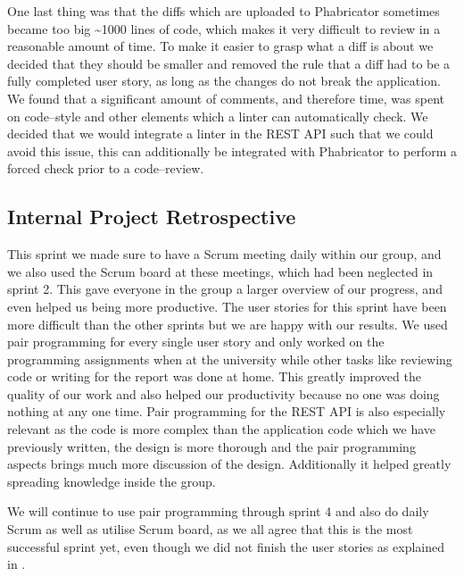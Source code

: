 One last thing was that the diffs which are uploaded to Phabricator sometimes became too big \textasciitilde 1000 lines of code, which makes it very difficult to review in a reasonable amount of time.
To make it easier to grasp what a diff is about we decided that they should be smaller and removed the rule that a diff had to be a fully completed user story, as long as the changes do not break the application.
We found that a significant amount of comments, and therefore time, was spent on code--style and other elements which a linter can automatically check.
We decided that we would integrate a linter in the REST API such that we could avoid this issue, this can additionally be integrated with Phabricator to perform a forced check prior to a code--review.

\subsection*{Internal Project Retrospective}
This sprint we made sure to have a Scrum meeting daily within our group, and we also used the Scrum board at these meetings, which had been neglected in sprint 2. 
This gave everyone in the group a larger overview of our progress, and even helped us being more productive.
The user stories for this sprint have been more difficult than the other sprints but we are happy with our results.
We used pair programming for every single user story and only worked on the programming assignments when at the university while other tasks like reviewing code or writing for the report was done at home.
This greatly improved the quality of our work and also helped our productivity because no one was doing nothing at any one time.
Pair programming for the REST API is also especially relevant as the code is more complex than the application code which we have previously written, the design is more thorough and the pair programming aspects brings much more discussion of the design.
Additionally it helped greatly spreading knowledge inside the group.

We will continue to use pair programming through sprint 4 and also do daily Scrum as well as utilise Scrum board, as we all agree that this is the most successful sprint yet, even though we did not finish the user stories as explained in .

